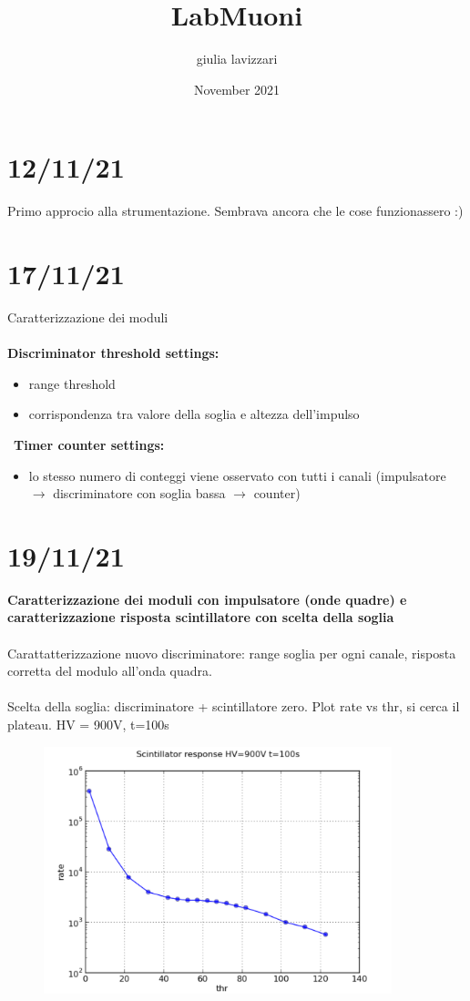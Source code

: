 \documentclass{article}
\title{LabMuoni}
\author{giulia lavizzari}
\date{November 2021}
\begin{document}
\maketitle

\section{12/11/21}
Primo approcio alla strumentazione. Sembrava ancora che le cose funzionassero :)

\section{17/11/21}
Caratterizzazione dei moduli
\\\\\textbf{Discriminator threshold settings:}
\begin{itemize}
    \item range threshold
    \item corrispondenza tra valore della soglia e altezza dell'impulso
\end{itemize}\
\textbf{Timer counter settings:}
\begin{itemize}
    \item lo stesso numero di conteggi viene osservato con tutti i canali (impulsatore $\rightarrow$ discriminatore con soglia bassa $\rightarrow$ counter)
\end{itemize}


\section{19/11/21}
\textbf{Caratterizzazione dei moduli con impulsatore (onde quadre) e caratterizzazione risposta scintillatore con scelta della soglia}\\\\
Carattatterizzazione nuovo discriminatore: range soglia per ogni canale, risposta corretta del modulo all'onda quadra.\\\\
Scelta della soglia: discriminatore + scintillatore zero. Plot rate vs thr, si cerca il plateau. HV = 900V, t=100s
\begin{figure}
    \centering
    \includegraphics[width=0.9\textwidth]{plot1.png}
\end{figure}
\end{document}
